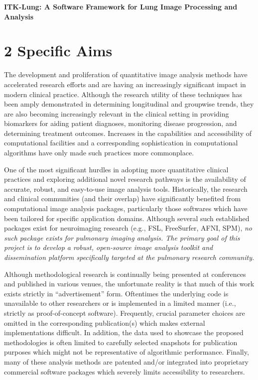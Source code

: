 \documentclass[11pt,]{article}
\title{}
\author{}
\date{}
\begin{document}
\maketitle


\begin{center}
{\Large \bf ITK-Lung:  A Software Framework for Lung Image Processing and Analysis}
\end{center}

\section{2 Specific Aims}\label{specific-aims}

The development and proliferation of quantitative image analysis methods
have accelerated research efforts and are having an increasingly
significant impact in modern clinical practice. Although the research
utility of these techniques has been amply demonstrated in determining
longitudinal and groupwise trends, they are also becoming increasingly
relevant in the clinical setting in providing biomarkers for aiding
patient diagnoses, monitoring disease progression, and determining
treatment outcomes. Increases in the capabilities and accessibility of
computational facilities and a corresponding sophistication in
computational algorithms have only made such practices more commonplace.

One of the most significant hurdles in adopting more quantitative
clinical practices and exploring additional novel research pathways is
the availability of accurate, robust, and easy-to-use image analysis
tools. Historically, the research and clinical communities (and their
overlap) have significantly benefited from computational image analysis
packages, particularly those softwares which have been tailored for
specific application domains. Although several such established packages
exist for neuroimaging research (e.g., FSL, FreeSurfer, AFNI, SPM),
\emph{no such package exists for pulmonary imaging analysis. The primary
goal of this project is to develop a robust, open-source image analysis
toolkit and dissemination platform specifically targeted at the
pulmonary research community.}

Although methodological research is continually being presented at
conferences and published in various venues, the unfortunate reality is
that much of this work exists strictly in ``advertisement'' form.
Oftentimes the underlying code is unavailable to other researchers or is
implemented in a limited manner (i.e., strictly as proof-of-concept
software). Frequently, crucial parameter choices are omitted in the
corresponding publication(s) which makes external implementations
difficult. In addition, the data used to showcase the proposed
methodologies is often limited to carefully selected snapshots for
publication purposes which might not be representative of algorithmic
performance. Finally, many of these analysis methods are patented and/or
integrated into proprietary commercial software packages which severely
limits accessibility to researchers.
\end{document}

